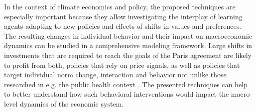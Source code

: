In the context of climate economics and policy, the proposed techniques are especially important because they allow investigating the interplay of learning agents adapting to new policies and effects of shifts in values and preferences. The resulting changes in individual behavior and their impact on macroeconomic dynamics can be studied in a comprehensive modeling framework. 
Large shifts in investments that are required to reach the goals of the Paris agreement are likely to profit from both, policies that rely on price signals, as well as policies that target individual norm change, interaction and behavior not unlike those researched in e.g. the public health context \cite{Zhang2016, Zhang2015, Centola2011}. The presented techniques can help to better understand how such behavioral interventions would impact the macro-level dynamics of the economic system.




